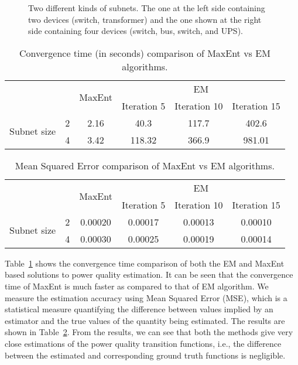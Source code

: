\begin{figure}[!t]
\centering \scriptsize
	\subfloat{\texttt{[image: s1]}}\qquad\qquad
	\subfloat{\texttt{[image: s2]}}
\caption{Two different kinds of subnets. The one at the left side containing two devices (switch, transformer) and the one shown at the right side containing four devices (switch, bus, switch, and UPS).} \label{fig:twosubnets}
\end{figure}


\begin{table}[!t]
\centering \caption{Convergence time (in seconds) comparison of MaxEnt vs EM algorithms.}
\begin{tabular}{c|c|c|c|c|c|}
\multicolumn{2}{c|}{\multirow{2}{*}{}} & \multirow{2}{*}{MaxEnt} & \multicolumn{3}{|c|}{EM}\\
\cline{4-6}
\multicolumn{2}{c|}{} & & Iteration 5 & Iteration 10 & Iteration 15\\
\hline
\multirow{2}{*}{Subnet size} & 2 & 2.16 & 40.3 & 117.7 & 402.6\\
\cline{2-6}
& 4 & 3.42 & 118.32 & 366.9 & 981.01\\
\hline
\end{tabular}
\label{tbl:eval_t}
\end{table}


\begin{table}[!t]
\centering \caption{Mean Squared Error comparison of MaxEnt vs EM algorithms.}
\begin{tabular}{c|c|c|c|c|c|}
\multicolumn{2}{c|}{\multirow{2}{*}{}} & \multirow{2}{*}{MaxEnt} & \multicolumn{3}{|c|}{EM}\\
\cline{4-6}
\multicolumn{2}{c|}{} & & Iteration 5 & Iteration 10 & Iteration 15\\
\hline
\multirow{2}{*}{Subnet size} & 2 & 0.00020 & 0.00017 & 0.00013 & 0.00010\\
\cline{2-6}
& 4 & 0.00030 & 0.00025 & 0.00019 & 0.00014\\
\hline
\end{tabular}
\label{tbl:eval_mse}
\end{table}


Table~\ref{tbl:eval_t} shows the convergence time comparison of both the EM and MaxEnt based solutions to power quality estimation. It can be seen that the convergence time of MaxEnt is much faster as compared to that of EM algorithm. We measure the estimation accuracy using Mean Squared Error (MSE), which is a statistical measure quantifying the difference between values implied by an estimator and the true values of the quantity being estimated. The results are shown in Table~\ref{tbl:eval_mse}. From the results, we can see that both the methods give very close estimations of the power quality transition functions, i.e., the difference between the estimated and corresponding ground truth functions is negligible.


